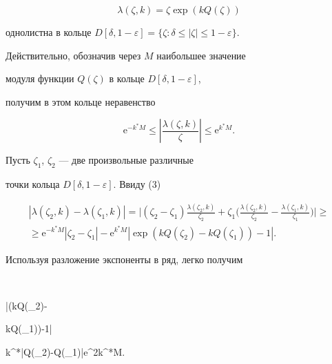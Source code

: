 \begin{equation}


\lambda(\zeta,k)=\zeta \exp\left (k Q(\zeta)\right )


\end{equation} 


однолистна в кольце $D[\delta,1-\varepsilon]=


\{\zeta:\delta\le|\zeta|\le1-\varepsilon\}$.


Действительно, обозначив через $M$ наибольшее значение 


модуля функции $Q(\zeta)$ в кольце $D[\delta,1-\varepsilon]$,


получим в этом кольце неравенство


\begin{equation}


\mathrm e^{-k^{*}M}\le \left |\frac{\lambda(\zeta,k)}{\zeta}\right |


\le \mathrm e^{k^{*}M}.


\end{equation}


Пусть $\zeta_{1}$, $\zeta_{2}$ --- две произвольные различные


точки кольца $D[\delta,1-\varepsilon]$. Ввиду (3) 


\begin{multline*}


|\lambda(\zeta_{2},k)-\lambda(\zeta_{1},k)|=


\bigg |(\zeta_{2}-\zeta_{1})\frac{\lambda(\zeta_{2},k)}


{\zeta_{2}}+


\zeta_{1}\bigg (\frac{\lambda(\zeta_{2},k)}{\zeta_{2}}-


\frac{\lambda(\zeta_{1},k)}{\zeta_{1}}\bigg )\bigg |\ge \\


%


\ge \mathrm e^{-k^{*}M}|\zeta_{2}-\zeta_{1}|-


\mathrm e^{k^{*}M}\left |\exp\left (kQ(\zeta_{2})-


kQ(\zeta_{1})\right )-1\right |.


\end{multline*}


Используя разложение экспоненты в ряд, легко получим


$$


\left |\exp\left (kQ(\zeta_{2})-


kQ(\zeta_{1})\right )-1\right |\le


k^{*}\left |Q(\zeta_{2})-Q(\zeta_{1})\right |\mathrm e^{2k^{*}M}.


